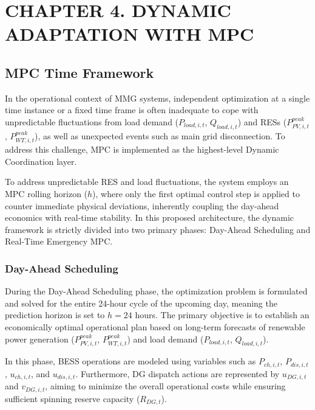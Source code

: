 \section*{CHAPTER 4.  DYNAMIC ADAPTATION WITH MPC}
\setcounter{section}{4}
\setcounter{subsection}{0}
\setcounter{equation}{0}
\subsection{MPC Time Framework}

In the operational context of MMG systems, independent optimization at a single time instance or a fixed time frame is often inadequate to cope with unpredictable fluctuations from load demand ($P_{load,i,t}$, $Q_{load,i,t}$) and RESs ($P_{PV,i,t}^{peak}$, $P_{WT,i,t}^{peak}$), as well as unexpected events such as main grid disconnection. To address this challenge, MPC is implemented as the highest-level Dynamic Coordination layer.

To address unpredictable RES and load fluctuations, the system employs an MPC rolling horizon ($h$), where only the first optimal control step is applied to counter immediate physical deviations, inherently coupling the day-ahead economics with real-time stability. In this proposed architecture, the dynamic framework is strictly divided into two primary phases: Day-Ahead Scheduling and Real-Time Emergency MPC.

\subsubsection{Day-Ahead Scheduling}

During the Day-Ahead Scheduling phase, the optimization problem is formulated and solved for the entire 24-hour cycle of the upcoming day, meaning the prediction horizon is set to $h = 24$ hours. The primary objective is to establish an economically optimal operational plan based on long-term forecasts of renewable power generation ($P_{PV,i,t}^{peak}$, $P_{WT,i,t}^{peak}$) and load demand ($P_{load,i,t}$, $Q_{load,i,t}$). 

In this phase, BESS operations are modeled using variables such as $P_{ch,i,t}$, $P_{dis,i,t}$, $u_{ch,i,t}$, and $u_{dis,i,t}$. Furthermore, DG dispatch actions are represented by $u_{DG,i,t}$ and $v_{DG,i,t}$, aiming to minimize the overall operational costs while ensuring sufficient spinning reserve capacity ($R_{DG,t}$).

